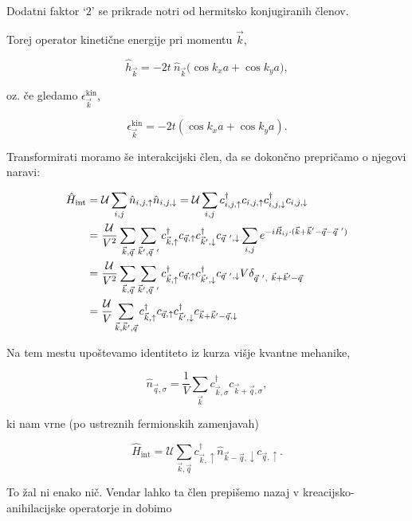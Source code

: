 \documentclass[a4paper, 12pt]{article}
\newcommand{\vq}{
	\ensuremath{\vec{q}}
}
\newcommand{\e}{
	\ensuremath{\epsilon}
}
\renewcommand{\u}{
	\ensuremath{\uparrow}
}
\renewcommand{\d}{
	\ensuremath{\downarrow}
}
\newcommand{\oh}{
	\ensuremath{\hat{h}}
}
\newcommand{\vk}{
	\ensuremath{\vec{k}}
}
\newcommand{\vR}{
	\ensuremath{\vec{R}_{ij}}
}
\newcommand{\s}{
	\ensuremath{\sigma}
}
\renewcommand{\ni}{
	\noindent
}
\begin{document}
\ni Dodatni faktor `$2$' se prikrade notri od hermitsko konjugiranih \v clenov.

Torej operator kineti\v cne energije pri momentu $\vk$,

\begin{equation}
	\oh_{\vk} = -2t\ \hat{n}_{\vk} \big(\cos k_x a + \cos k_y a),
\end{equation}

\ni oz. \v ce gledamo $\e_{\vk}^\text{kin}$,

\begin{equation}
	\e_{\vk}^\text{kin} = -2t (\cos k_x a + \cos k_y a).
\end{equation}

Transformirati moramo \v se interakcijski \v clen, da se dokon\v cno prepri\v camo o njegovi naravi:

\begin{align}
	\hat{H}_\text{int} &= \mathcal{U}\sum_{i,j}\hat{n}_{i,j,\u}\hat{n}_{i,j,\d}
		= \mathcal{U}\sum_{i,j} c^\dagger_{i,j,\u}c_{i,j,\u} c^\dagger_{i,j,\d} c_{i,j,\d}
		\notag \\
	&= \frac{\mathcal{U}}{V^2} \sum_{\vk,\vq}\sum_{\vk^\prime,\vq\ ^\prime}
		c^\dagger_{\vk,\u}c_{\vq,\u}c^\dagger_{\vk',\d}c_{\vq\ ',\d} \sum_{i,j}
		e^{-i \vR\cdot (\vk + \vk' - \vq - \vq\ ')} \notag \\
	&= \frac{\mathcal{U}}{V^2} \sum_{\vk,\vq}\sum_{\vk^\prime,\vq\ ^\prime}
		c^\dagger_{\vk,\u}c_{\vq,\u}c^\dagger_{\vk',\d}c_{\vq\ ',\d}
		V \delta_{\vq\ ',\ \vk + \vk' - \vq} \notag  \\
	&= \frac{\mathcal{U}}{V} \sum_{\vk, \vk', \vq} c^\dagger_{\vk,\u} c_{\vq, \u}
		c^\dagger_{\vk', \d} c_{\vk + \vk' - \vq, \d}
\end{align}

\ni Na tem mestu upo\v stevamo identiteto iz kurza vi\v sje kvantne mehanike,

\begin{equation}
	\hat{n}_{\vq,\s} = \frac{1}{V}\sum_{\vk} c^\dagger_{\vk, \s} c_{\vk + \vq, \s},
\end{equation}

\ni ki nam vrne (po ustreznih fermionskih zamenjavah)

\begin{equation}
	\hat{H}_\text{int} = \mathcal{U} \sum_{\vk,\vq} c^\dagger_{\vk,\u}
		\hat{n}_{\vk - \vq,\d} c_{\vq, \u}.
\end{equation}

\ni To \v zal ni enako ni\v c. Vendar lahko ta \v clen prepi\v semo
nazaj v kreacijsko-anihilacijske operatorje in dobimo
\end{document}
